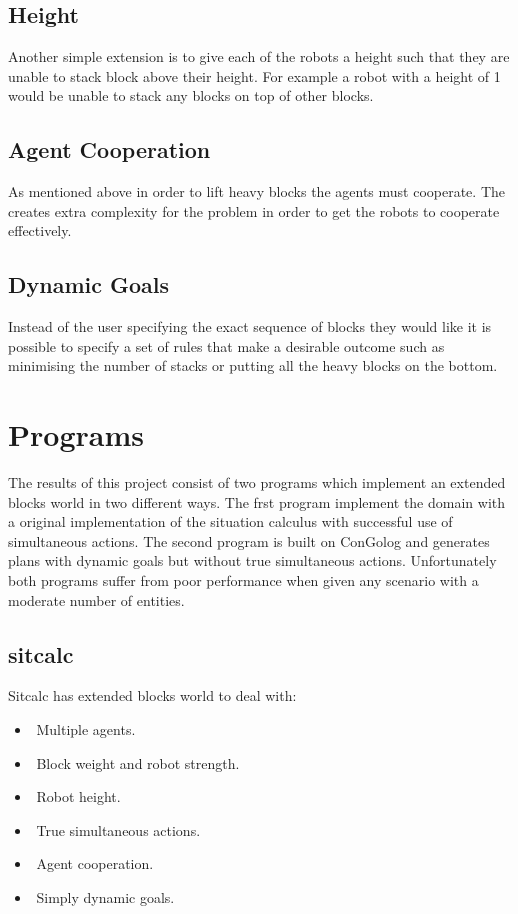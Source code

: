 \documentclass{article}
\begin{document}
\subsection{Height}

Another simple extension is to give each of the robots a height such that they
are unable to stack block above their height. For example a robot with a height
of 1 would be unable to stack any blocks on top of other blocks.

\subsection{Agent Cooperation}

As mentioned above in order to lift heavy blocks the agents must cooperate. The
creates extra complexity for the problem in order to get the robots to cooperate
effectively.

\subsection{Dynamic Goals}

Instead of the user specifying the exact sequence of blocks they would like
it is possible to specify a set of rules that make a desirable outcome such as
minimising the number of stacks or putting all the heavy blocks on the bottom.

\section{Programs}

The results of this project consist of two programs which implement an extended
blocks world in two different ways. The frst program implement the domain
with a original implementation of the situation calculus with successful use of
simultaneous actions. The second program is built on ConGolog and generates
plans with dynamic goals but without true simultaneous actions.
Unfortunately both programs suffer from poor performance when given any
scenario with a moderate number of entities.

\subsection{sitcalc}
Sitcalc has extended blocks world to deal with:
\begin{itemize}
	\item Multiple agents.
	\item Block weight and robot strength.
	\item Robot height.
	\item True simultaneous actions.
	\item Agent cooperation.
	\item Simply dynamic goals.
\end{itemize}
\end{document}
